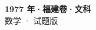 \documentclass[zihao=-4, a4paper]{ctexart}
\begin{document}
\begin{center}
  {\Large\bfseries 1977 年·福建卷·文科}\\[4pt]
  {\large 数学 · 试题版}
\end{center}
\medskip
{}

\end{document}
